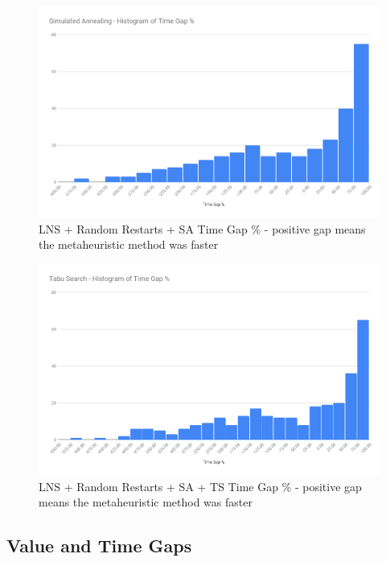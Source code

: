 \begin{figure}[!htbp]
    \centering
    \includegraphics[width=\textwidth]{Figures/Metaheuristics/annealing_time_gap.png}
    \caption{LNS + Random Restarts + SA Time Gap \% - positive gap means the metaheuristic method was faster}
    \label{fig:time_gap_perc_annealing}
\end{figure}

\begin{figure}[!htbp]
    \centering
    \includegraphics[width=\textwidth]{Figures/Metaheuristics/tabu_time_gap.png}
    \caption{LNS + Random Restarts + SA + TS Time Gap \% - positive gap means the metaheuristic method was faster}
    \label{fig:time_gap_perc_tabu}
\end{figure}

\FloatBarrier

\subsection{Value and Time Gaps}


